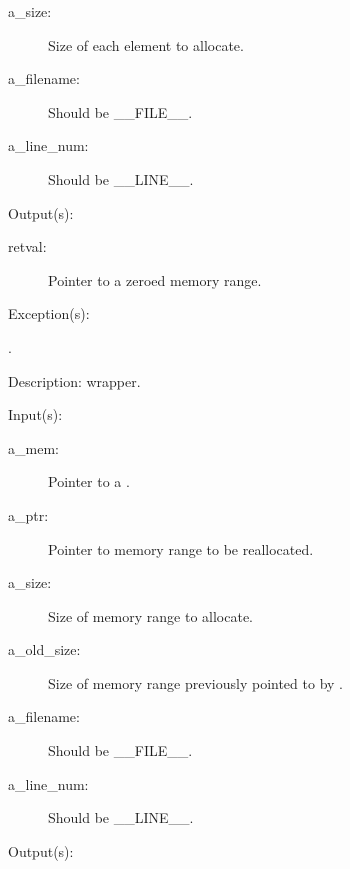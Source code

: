 \begin{capi}
\begin{capilist}
\begin{description}
		\item[a\_size: ]
			Size of each element to allocate.
		\item[a\_filename: ]
			Should be \_\_FILE\_\_.
		\item[a\_line\_num: ]
			Should be \_\_LINE\_\_.
		\end{description}
	\item[Output(s): ]
		\begin{description}\item[]
		\item[retval: ]
			Pointer to a zeroed memory range.
		\end{description}
	\item[Exception(s): ]
		\begin{description}\item[]
		\item[.]
		\end{description}
	\item[Description: ]
		 wrapper.
	\end{capilist}
\label{mem_realloc_e}
\label{mem_realloc}
\label{_cw_realloc}
	\begin{capilist}
	\item[Input(s): ]
		\begin{description}\item[]
		\item[a\_mem: ]
			Pointer to a .
		\item[a\_ptr: ]
			Pointer to memory range to be reallocated.
		\item[a\_size: ]
			Size of memory range to allocate.
		\item[a\_old\_size: ]
			Size of memory range previously pointed to by
			.
		\item[a\_filename: ]
			Should be \_\_FILE\_\_.
		\item[a\_line\_num: ]
			Should be \_\_LINE\_\_.
		\end{description}
	\item[Output(s): ]

\end{capilist}
\end{capi}
